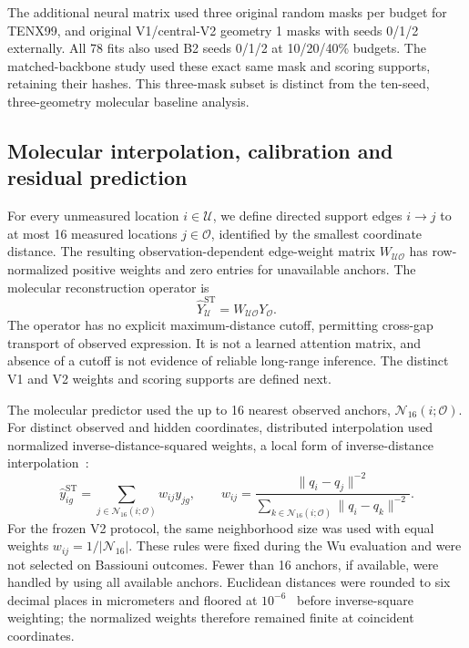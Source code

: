 The additional neural matrix used three original random masks per budget for TENX99, and original V1/central-V2 geometry 1 masks with seeds 0/1/2 externally. All 78 fits also used B2 seeds 0/1/2 at 10/20/40\% budgets. The matched-backbone study used these exact same mask and scoring supports, retaining their hashes. This three-mask subset is distinct from the ten-seed, three-geometry molecular baseline analysis.

\subsection{Molecular interpolation, calibration and residual prediction}
For every unmeasured location $i\in\mathcal U$, we define directed support edges $i\rightarrow j$ to at most 16 measured locations $j\in\mathcal O$, identified by the smallest coordinate distance. The resulting observation-dependent edge-weight matrix $W_{\mathcal U\mathcal O}$ has row-normalized positive weights and zero entries for unavailable anchors. The molecular reconstruction operator is
\begin{equation}
\widehat{Y}^{\mathrm{ST}}_{\mathcal U}=W_{\mathcal U\mathcal O}Y_{\mathcal O}.
\label{eq:molecular_graph}
\end{equation}
The operator has no explicit maximum-distance cutoff, permitting cross-gap transport of observed expression. It is not a learned attention matrix, and absence of a cutoff is not evidence of reliable long-range inference. The distinct V1 and V2 weights and scoring supports are defined next.

The molecular predictor used the up to 16 nearest observed anchors, $\mathcal N_{16}(i;\mathcal O)$. For distinct observed and hidden coordinates, distributed interpolation used normalized inverse-distance-squared weights, a local form of inverse-distance interpolation~\cite{shepard1968}:
\begin{equation}
 \widehat y_{ig}^{\mathrm{ST}}=\sum_{j\in\mathcal N_{16}(i;\mathcal O)}w_{ij}y_{jg},\qquad
 w_{ij}=\frac{\|q_i-q_j\|^{-2}}{\sum_{k\in\mathcal N_{16}(i;\mathcal O)}\|q_i-q_k\|^{-2}}.
 \label{eq:interp}
\end{equation}
For the frozen V2 protocol, the same neighborhood size was used with equal weights $w_{ij}=1/|\mathcal N_{16}|$. These rules were fixed during the Wu evaluation and were not selected on Bassiouni outcomes. Fewer than 16 anchors, if available, were handled by using all available anchors. Euclidean distances were rounded to six decimal places in micrometers and floored at $10^{-6}$~\um{} before inverse-square weighting; the normalized weights therefore remained finite at coincident coordinates.

